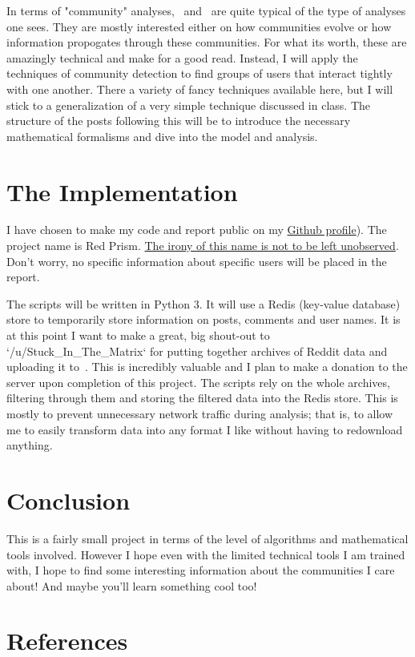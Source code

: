 In terms of "community" analyses,~\cite{c4} and~\cite{c5} are quite typical of the type of analyses one sees.
They are mostly interested either on how communities evolve or how information propogates through these communities.
For what its worth, these are amazingly technical and make for a good read.
Instead, I will apply the techniques of community detection to find groups of users that interact tightly with one another.
There a variety of fancy techniques available here, but I will stick to a generalization of a very simple technique discussed in class.
The structure of the posts following this will be to introduce the necessary mathematical formalisms and dive into the model and analysis.

\section{The Implementation}
I have chosen to make my code and report public on my \href{https://github.com/rollends/red-prism}{Github profile}). The project name is Red Prism.
\href{https://en.wikipedia.org/wiki/PRISM_(surveillance_program)}{The irony of this name is not to be left unobserved}.
Don't worry, no specific information about specific users will be placed in the report.

The scripts will be written in Python 3.
It will use a Redis (key-value database) store to temporarily store information on posts, comments and user names.
It is at this point I want to make a great, big shout-out to `/u/Stuck\_In\_The\_Matrix` for putting together archives of Reddit data and uploading it to~\cite{c6}.
This is incredibly valuable and I plan to make a donation to the server upon completion of this project.
The scripts rely on the whole archives, filtering through them and storing the filtered data into the Redis store.
This is mostly to prevent unnecessary network traffic during analysis;
that is, to allow me to easily transform data into any format I like without having to redownload anything.

\section{Conclusion}
This is a fairly small project in terms of the level of algorithms and mathematical tools involved.
However I hope even with the limited technical tools I am trained with, I hope to find some interesting information about the communities I care about!
And maybe you'll learn something cool too!

\section{References}
\printbibliography
